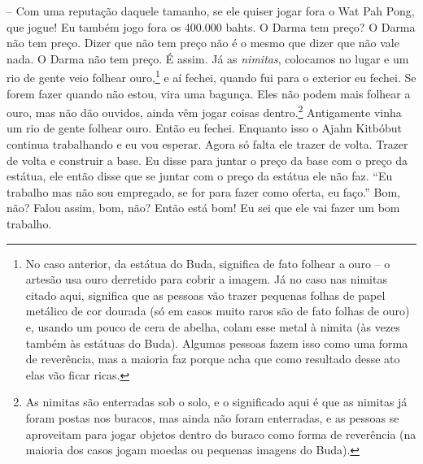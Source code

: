 -- Com uma reputação daquele tamanho, se ele quiser jogar fora o
Wat Pah Pong, que jogue! Eu também jogo fora os 400.000 bahts. O Darma
tem preço? O Darma não tem preço. Dizer que não tem preço não é o mesmo
que dizer que não vale nada. O Darma não tem preço. É assim. Já as
\textit{nimitas}, colocamos no lugar e um rio de gente veio folhear
ouro,\footnote{No caso anterior, da estátua do Buda, significa de fato
folhear a ouro – o artesão usa ouro derretido para cobrir a imagem. Já
no caso nas nimitas citado aqui, significa que as pessoas vão trazer
pequenas folhas de papel metálico de cor dourada (só em casos muito
raros são de fato folhas de ouro) e, usando um pouco de cera de abelha,
colam esse metal à nimita (às vezes também às estátuas do Buda).
Algumas pessoas fazem isso como uma forma de reverência, mas a maioria
faz porque acha que como resultado desse ato elas vão ficar ricas.} e
aí fechei, quando fui para o exterior eu fechei. Se forem fazer quando
não estou, vira uma bagunça. Eles não podem mais folhear a ouro, mas
não dão ouvidos, ainda vêm jogar coisas dentro.\footnote{As nimitas são
enterradas sob o solo, e o significado aqui é que as nimitas já foram
postas nos buracos, mas ainda não foram enterradas, e as pessoas se
aproveitam para jogar objetos dentro do buraco como forma de reverência
(na maioria dos casos jogam moedas ou pequenas imagens do Buda).}
Antigamente vinha um rio de gente folhear ouro. Então eu fechei.
Enquanto isso o Ajahn Kitbóbut continua trabalhando e eu vou esperar.
Agora só falta ele trazer de volta. Trazer de volta e construir a base.
Eu disse para juntar o preço da base com o preço da estátua, ele então
disse que se juntar com o preço da estátua ele não faz. “Eu trabalho
mas não sou empregado, se for para fazer como oferta, eu faço.” Bom,
não? Falou assim, bom, não? Então está bom! Eu sei que ele vai fazer um
bom trabalho.

